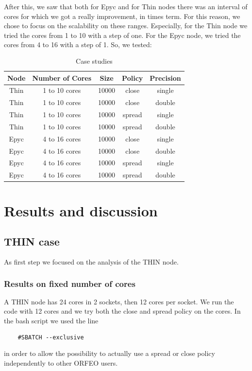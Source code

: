 \documentclass{article}
\begin{document}
After this, we saw that both for Epyc and for Thin nodes there was an interval of cores for which we got a really improvement, in times term.
For this reason, we chose to focus on the scalability on these ranges.
Especially, for the Thin node we tried the cores from 1 to 10 with a step of one. For the Epyc node, we tried the cores from 4 to 16 with a step of 1. 
So, we tested:
\begin{table}[h]
\centering
\begin{tabular}{|c|c|c|c|c|}
\hline
\textbf{Node} & \textbf{Number of Cores} & \textbf{Size} & \textbf{Policy} & \textbf{Precision} \\
\hline
Thin & 1 to 10 cores & 10000 & close & single \\
Thin & 1 to 10 cores & 10000 & close & double \\
Thin & 1 to 10 cores & 10000 & spread & single \\
Thin & 1 to 10 cores & 10000 & spread & double \\
\hline
Epyc & 4 to 16 cores & 10000 & close & single \\
Epyc & 4 to 16 cores & 10000 & close & double \\
Epyc & 4 to 16 cores & 10000 & spread & single \\
Epyc & 4 to 16 cores & 10000 & spread & double \\
\hline
\end{tabular}
\caption{Case studies}
\label{tab:node-config}
\end{table}


\section{Results and discussion}

\subsection{THIN case}

As first step we focused on the analysis of the THIN node.

\subsubsection{Results on fixed number of cores}

A THIN node has 24 cores in 2 sockets, then 12 cores per socket. We run the code with 12 cores and we try both the close and spread policy on the cores. In the bash script we used the line
\begin{verbatim}
    #SBATCH --exclusive
\end{verbatim}
in order to allow the possibility to actually use a spread or close policy independently to other ORFEO users.
\end{document}
